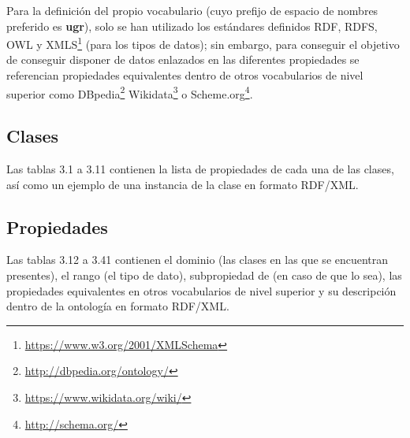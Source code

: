Para la definición del propio vocabulario (cuyo prefijo de espacio de nombres preferido es \textbf{ugr}), solo se han utilizado los estándares definidos RDF, RDFS, OWL y XMLS\footnote{\url{https://www.w3.org/2001/XMLSchema}} (para los tipos de datos); sin embargo, para conseguir el objetivo de conseguir disponer de datos enlazados en las diferentes propiedades se referencian propiedades equivalentes dentro de otros vocabularios de nivel superior como DBpedia\footnote{\url{http://dbpedia.org/ontology/}} Wikidata\footnote{\url{https://www.wikidata.org/wiki/}} o Scheme.org\footnote{\url{http://schema.org/}}.

\subsection{Clases}

Las tablas 3.1 a 3.11 contienen la lista de propiedades de cada una de las clases, así como un ejemplo de una instancia de la clase en formato RDF/XML. 

\subsection{Propiedades}

Las tablas 3.12 a 3.41 contienen el dominio (las clases en las que se encuentran presentes), el rango (el tipo de dato), subpropiedad de (en caso de que lo sea), las propiedades equivalentes en otros vocabularios de nivel superior y su descripción dentro de la ontología en formato RDF/XML.
\bigskip

